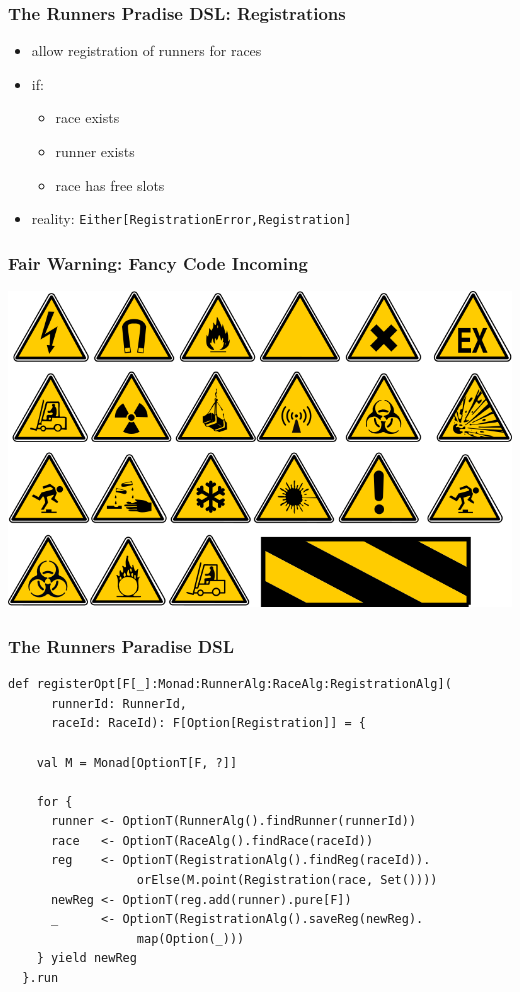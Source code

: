 \documentclass{beamer}
\begin{document}
\begin{frame}
  \frametitle{The Runners Pradise DSL: Registrations}
  \begin{itemize}
  \item allow registration of runners for races
  \item if:
    \begin{itemize}
    \item race exists
    \item runner exists
    \item race has free slots
    \end{itemize}
  \item reality: \texttt{Either[RegistrationError,Registration]}
  \end{itemize}
\end{frame}

\begin{frame}
  \frametitle{Fair Warning: Fancy Code Incoming}
  \includegraphics[width=\textwidth]{../pics/warning.png}
\end{frame}

\begin{frame}[fragile]
  \frametitle{The Runners Paradise DSL}
\begin{verbatim}
def registerOpt[F[_]:Monad:RunnerAlg:RaceAlg:RegistrationAlg](
      runnerId: RunnerId,
      raceId: RaceId): F[Option[Registration]] = {

    val M = Monad[OptionT[F, ?]]

    for {
      runner <- OptionT(RunnerAlg().findRunner(runnerId))
      race   <- OptionT(RaceAlg().findRace(raceId))
      reg    <- OptionT(RegistrationAlg().findReg(raceId)).
                  orElse(M.point(Registration(race, Set())))
      newReg <- OptionT(reg.add(runner).pure[F])
      _      <- OptionT(RegistrationAlg().saveReg(newReg).
                  map(Option(_)))
    } yield newReg
  }.run
\end{verbatim}
\end{frame}
\end{document}
